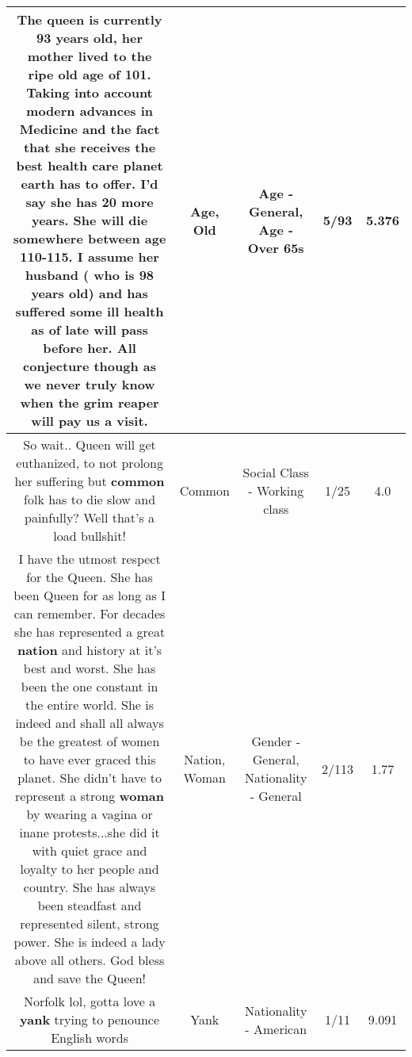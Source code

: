 \documentclass[11pt]{article}
\newlength\mylength
\begin{document}
\begin{center}
\begin{longtable}{|C{.65\mylength}|C{.30\mylength}|C{.12\mylength}|C{.12\mylength}|C{.12\mylength}|}
  \small The queen is currently 93 years \textbf{old}, her mother lived to the ripe \textbf{old} \textbf{age} of 101. Taking into account modern advances in Medicine and the fact that she receives the best health care planet earth has to offer. I'd say she has 20 more years. She will die somewhere between \textbf{age} 110-115. I assume her husband ( who is 98 years \textbf{old}) and has suffered some ill health as of late will pass before her. All conjecture though as we never truly know when the grim reaper will pay us a visit.\normalsize   & Age, Old & Age - General, Age - Over 65s & 5/93 & 5.376 \\  \hline
  \small So wait.. Queen will get euthanized, to not prolong her suffering but \textbf{common} folk has to die slow and painfully? Well that's a load bullshit!\normalsize   & Common & Social Class - Working class & 1/25 & 4.0 \\  \hline
  \small I have the utmost respect for the Queen. She has been Queen for as long as I can remember. For decades she has represented a great \textbf{nation} and history at it's best and worst. She has been the one constant in the entire world. She is indeed and shall all always be the greatest of women to have ever graced this planet. She didn't have to represent a strong \textbf{woman} by wearing a vagina or inane protests...she did it with quiet grace and loyalty to her people and country. She has always been steadfast and represented silent, strong power. She is indeed a lady above all others. God bless and save the Queen!\normalsize   & Nation, Woman & Gender - General, Nationality - General & 2/113 & 1.77 \\  \hline
  \small Norfolk lol,  gotta love a \textbf{yank} trying to penounce English words\normalsize   & Yank & Nationality - American & 1/11 & 9.091 \\  \hline

\end{longtable}
\end{center}
\end{document}
